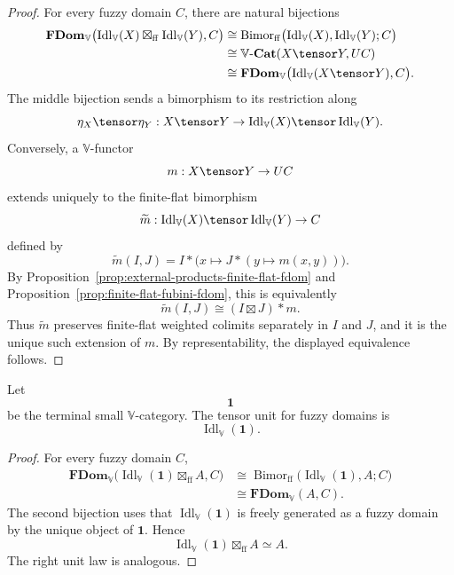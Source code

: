 \begin{proof}
For every fuzzy domain \(C\), there are natural bijections
\[
\begin{aligned}
\mathbf{FDom}_{\mathbb V}
\bigl(
    \operatorname{Idl}_{\mathbb V}(X)
    \boxtimes_{\mathrm{ff}}
    \operatorname{Idl}_{\mathbb V}(Y),
    C
\bigr)
&\cong
\operatorname{Bimor}_{\mathrm{ff}}
\bigl(
    \operatorname{Idl}_{\mathbb V}(X),
    \operatorname{Idl}_{\mathbb V}(Y);
    C
\bigr)
\\
&\cong
\mathbb V\text{-}\mathbf{Cat}(X\tensor Y,UC)
\\
&\cong
\mathbf{FDom}_{\mathbb V}
\bigl(
    \operatorname{Idl}_{\mathbb V}(X\tensor Y),
    C
\bigr).
\end{aligned}
\]
The middle bijection sends a bimorphism to its restriction along
\[
    \eta_X\tensor\eta_Y:
    X\tensor Y\to
    \operatorname{Idl}_{\mathbb V}(X)\tensor\operatorname{Idl}_{\mathbb V}(Y).
\]
Conversely, a \(\mathbb V\)-functor
\[
    m:X\tensor Y\to UC
\]
extends uniquely to the finite-flat bimorphism
\[
    \widetilde m:
    \operatorname{Idl}_{\mathbb V}(X)\tensor\operatorname{Idl}_{\mathbb V}(Y)\to C
\]
defined by
\[
    \widetilde m(I,J)
    =
    I*\bigl(x\mapsto J*(y\mapsto m(x,y))\bigr).
\]
By Proposition~\ref{prop:external-products-finite-flat-fdom} and
Proposition~\ref{prop:finite-flat-fubini-fdom}, this is equivalently
\[
    \widetilde m(I,J)\cong (I\boxtimes J)*m.
\]
Thus \(\widetilde m\) preserves finite-flat weighted colimits separately in
\(I\) and \(J\), and it is the unique such extension of \(m\).  By
representability, the displayed equivalence follows.
\end{proof}

\begin{corollary}
\label{cor:tensor-unit-fdom}
Let
\[
    \mathbf 1
\]
be the terminal small \(\mathbb V\)-category.  The tensor unit for fuzzy domains is
\[
    \operatorname{Idl}_{\mathbb V}(\mathbf 1).
\]
\end{corollary}

\begin{proof}
For every fuzzy domain \(C\),
\[
\begin{aligned}
    \mathbf{FDom}_{\mathbb V}
    \bigl(
        \operatorname{Idl}_{\mathbb V}(\mathbf 1)
        \boxtimes_{\mathrm{ff}}A,
        C
    \bigr)
    &\cong
    \operatorname{Bimor}_{\mathrm{ff}}
    \bigl(
        \operatorname{Idl}_{\mathbb V}(\mathbf 1),
        A;
        C
    \bigr)
    \\
    &\cong
    \mathbf{FDom}_{\mathbb V}(A,C).
\end{aligned}
\]
The second bijection uses that \(\operatorname{Idl}_{\mathbb V}(\mathbf 1)\) is
freely generated as a fuzzy domain by the unique object of \(\mathbf 1\).  Hence
\[
    \operatorname{Idl}_{\mathbb V}(\mathbf 1)\boxtimes_{\mathrm{ff}}A
    \simeq
    A.
\]
The right unit law is analogous.
\end{proof}

